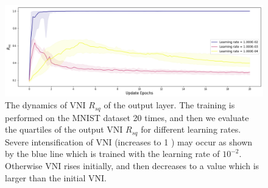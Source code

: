 \begin{figure}
\centering

\newcommand{\myWidth}{0.98\linewidth}
\includegraphics[width=\myWidth]{"dynamics_e20"}
\caption[The dynamics of VNI $R_{sq}$ of the output layer.]
{
The dynamics of VNI $R_{sq}$ of the output layer.
The training is performed on the MNIST dataset 20 times, and then we evaluate the quartiles of the output VNI $R_{sq}$
for different learning rates.
Severe intensification of VNI (increases to 1 ) may occur as shown by the blue line which is trained with the learning rate of $10^{-2}$.
Otherwise VNI rises initially, and then decreases to a value which is larger than the initial VNI.
}
\label{fig:sec5_sim1}
\end{figure}
